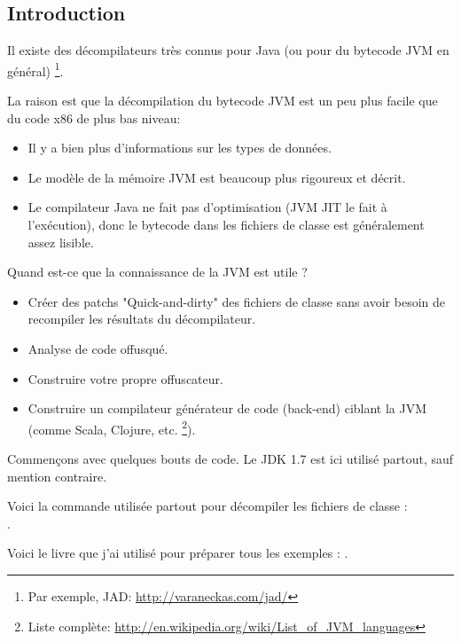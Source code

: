 \subsection{Introduction}

\newcommand{\JADURL}{\url{http://varaneckas.com/jad/}}

Il existe des décompilateurs très connus pour Java (ou pour du bytecode \ac{JVM} en général)
\footnote{Par exemple, JAD: \JADURL}.

La raison est que la décompilation du bytecode \ac{JVM} est un peu plus facile
que du code x86 de plus bas niveau:

\begin{itemize}
\item Il y a bien plus d'informations sur les types de données.
\item Le modèle de la mémoire \ac{JVM} est beaucoup plus rigoureux et décrit.
\item Le compilateur Java ne fait pas d'optimisation (\ac{JVM} \ac{JIT} le fait à l'exécution),
      donc le bytecode dans les fichiers de classe est généralement assez lisible.
      
\end{itemize}

Quand est-ce que la connaissance de la \ac{JVM} est utile ?

\newcommand{\URLListOfJVMLangs}{\url{http://en.wikipedia.org/wiki/List_of_JVM_languages}}

\begin{itemize}
\item Créer des patchs "Quick-and-dirty" des fichiers de classe sans avoir besoin de recompiler les résultats du décompilateur.
\item Analyse de code offusqué.
\item Construire votre propre offuscateur.
\item Construire un compilateur générateur de code (back-end) ciblant la \ac{JVM} (comme Scala, Clojure, etc.
      \footnote{Liste complète: \URLListOfJVMLangs}).
      
\end{itemize}

Commençons avec quelques bouts de code.
Le JDK 1.7 est ici utilisé partout, sauf mention contraire.

Voici la commande utilisée partout pour décompiler les fichiers de classe :\\
.

Voici le livre que j'ai utilisé pour préparer tous les exemples : \JavaBook.

